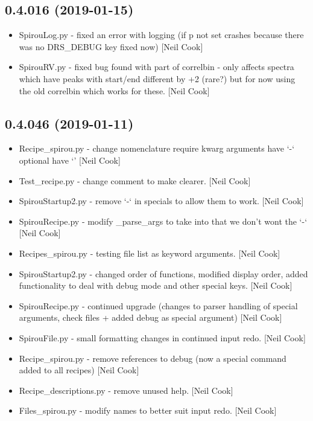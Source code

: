 \documentclass[a4paper,10pt,english]{report}
\begin{document}
\subsection{0.4.016 (2019-01-15)}
\label{\detokenize{misc/changelog:id216}}\begin{itemize}
\item {} 
SpirouLog.py - fixed an error with logging (if p not set crashes
because there was no DRS\_DEBUG key \textendash{} fixed now) {[}Neil Cook{]}

\item {} 
SpirouRV.py - fixed bug found with part of correlbin - only affects
spectra which have peaks with start/end different by +2 (rare?) but
for now using the old correlbin which works for these. {[}Neil Cook{]}

\end{itemize}


\subsection{0.4.046 (2019-01-11)}
\label{\detokenize{misc/changelog:id217}}\begin{itemize}
\item {} 
Recipe\_spirou.py - change nomenclature require kwarg arguments have
‘-‘ optional have ‘\textendash{}’ {[}Neil Cook{]}

\item {} 
Test\_recipe.py - change comment to make clearer. {[}Neil Cook{]}

\item {} 
SpirouStartup2.py - remove ‘-‘ in specials to allow them to work.
{[}Neil Cook{]}

\item {} 
SpirouRecipe.py - modify \_parse\_args to take into that we don’t wont
the ‘-‘ {[}Neil Cook{]}

\item {} 
Recipes\_spirou.py - testing file list as keyword arguments. {[}Neil
Cook{]}

\item {} 
SpirouStartup2.py - changed order of functions, modified display
order, added functionality to deal with debug mode and other special
keys. {[}Neil Cook{]}

\item {} 
SpirouRecipe.py - continued upgrade (changes to parser handling of
special arguments, check files + added debug as special argument)
{[}Neil Cook{]}

\item {} 
SpirouFile.py - small formatting changes in continued input redo.
{[}Neil Cook{]}

\item {} 
Recipe\_spirou.py - remove references to debug (now a special command
added to all recipes) {[}Neil Cook{]}

\item {} 
Recipe\_descriptions.py - remove unused help. {[}Neil Cook{]}

\item {} 
Files\_spirou.py - modify names to better suit input redo. {[}Neil Cook{]}

\end{itemize}
\end{document}
